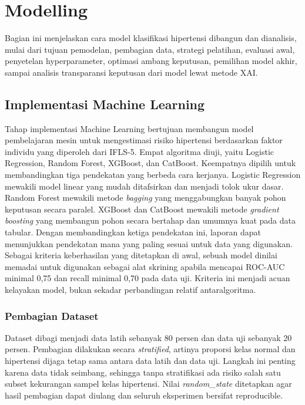 \section{Modelling}
\label{sec:pemodelan-data}
Bagian ini menjelaskan cara model klasifikasi hipertensi dibangun dan dianalisis, mulai dari tujuan pemodelan, pembagian data, strategi pelatihan, evaluasi awal, penyetelan hyperparameter, optimasi ambang keputusan, pemilihan model akhir, sampai analisis transparansi keputusan dari model lewat metode XAI.

\subsection{Implementasi Machine Learning}
\label{subsec:tujuan-pemodelan}
Tahap implementasi Machine Learning bertujuan membangun model pembelajaran mesin untuk mengestimasi risiko hipertensi berdasarkan faktor individu yang diperoleh dari IFLS-5. Empat algoritma diuji, yaitu Logistic Regression, Random Forest, XGBoost, dan CatBoost. Keempatnya dipilih untuk membandingkan tiga pendekatan yang berbeda cara kerjanya. Logistic Regression mewakili model linear yang mudah ditafsirkan dan menjadi tolok ukur dasar. Random Forest mewakili metode \emph{bagging} yang menggabungkan banyak pohon keputusan secara paralel. XGBoost dan CatBoost mewakili metode \emph{gradient boosting} yang membangun pohon secara bertahap dan umumnya kuat pada data tabular. Dengan membandingkan ketiga pendekatan ini, laporan dapat menunjukkan pendekatan mana yang paling sesuai untuk data yang digunakan. Sebagai kriteria keberhasilan yang ditetapkan di awal, sebuah model dinilai memadai untuk digunakan sebagai alat skrining apabila mencapai ROC-AUC minimal 0,75 dan recall minimal 0,70 pada data uji. Kriteria ini menjadi acuan kelayakan model, bukan sekadar perbandingan relatif antaralgoritma.

\subsubsection{Pembagian Dataset}
\label{subsec:pembagian-dataset}
Dataset dibagi menjadi data latih sebanyak 80 persen dan data uji sebanyak 20 persen. Pembagian dilakukan secara \emph{stratified}, artinya proporsi kelas normal dan hipertensi dijaga tetap sama antara data latih dan data uji. Langkah ini penting karena data tidak seimbang, sehingga tanpa stratifikasi ada risiko salah satu subset kekurangan sampel kelas hipertensi. Nilai \textit{random\_state} ditetapkan agar hasil pembagian dapat diulang dan seluruh eksperimen bersifat reproducible.

